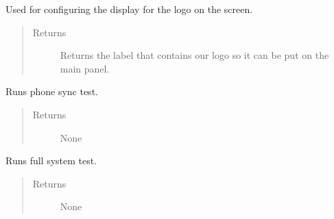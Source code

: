 \documentclass[letterpaper,10pt,english]{sphinxmanual}
\begin{document}
\begin{fulllineitems}
\begin{fulllineitems}
\label{\detokenize{index:src.Views.View_VerifySetupScreen.VerifySetupWindow.setupPicture}}
Used for configuring the display for the logo on the screen.
\begin{quote}\begin{description}
\item[{Returns}] \leavevmode
Returns the label that contains our logo so it can be put on the main panel.

\end{description}\end{quote}

\end{fulllineitems}


\begin{fulllineitems}
\label{\detokenize{index:src.Views.View_VerifySetupScreen.VerifySetupWindow.syncPhone}}
Runs phone sync test.
\begin{quote}\begin{description}
\item[{Returns}] \leavevmode
None

\end{description}\end{quote}

\end{fulllineitems}


\begin{fulllineitems}
\label{\detokenize{index:src.Views.View_VerifySetupScreen.VerifySetupWindow.testFull}}
Runs full system test.
\begin{quote}\begin{description}
\item[{Returns}] \leavevmode
None

\end{description}\end{quote}


\end{fulllineitems}
\end{fulllineitems}
\end{document}
